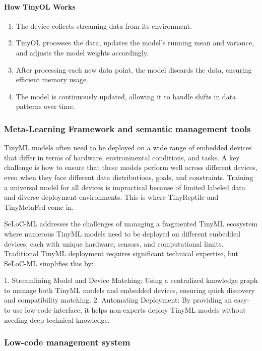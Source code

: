 \documentclass[twocolumn]{article}
\begin{document}
\paragraph{How TinyOL Works}

\begin{enumerate}
    \item The device collects streaming data from its environment.
    \item TinyOL processes the data, updates the model’s running mean and variance, and adjusts the model weights accordingly.
    \item After processing each new data point, the model discards the data, ensuring efficient memory usage.
    \item The model is continuously updated, allowing it to handle shifts in data patterns over time.
\end{enumerate}
\subsubsection{Meta-Learning Framework and semantic management tools }

TinyML models often need to be deployed on a wide range of embedded devices that differ in terms of hardware, environmental conditions, and tasks. A key challenge is how to ensure that these models perform well across different devices, even when they face different data distributions, goals, and constraints. Training a universal model for all devices is impractical because of limited labeled data and diverse deployment environments. This is where TinyReptile and TinyMetaFed come in.

SeLoC-ML addresses the challenges of managing a fragmented TinyML ecosystem where numerous TinyML models need to be deployed on different embedded devices, each with unique hardware, sensors, and computational limits. Traditional TinyML deployment requires significant technical expertise, but SeLoC-ML simplifies this by:

	1.	Streamlining Model and Device Matching: Using a centralized knowledge graph to manage both TinyML models and embedded devices, ensuring quick discovery and compatibility matching.
	2.	Automating Deployment: By providing an easy-to-use low-code interface, it helps non-experts deploy TinyML models without needing deep technical knowledge.

\subsubsection{Low-code management system}
\end{document}
